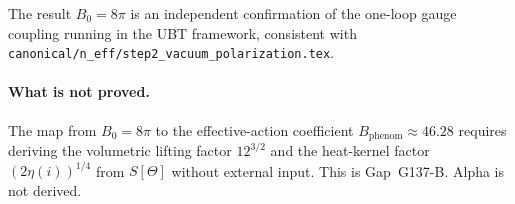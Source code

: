 \documentclass[12pt,a4paper]{article}
\theoremstyle{definition}
\theoremstyle{remark}
\begin{document}
The result $B_0 = 8\pi$ is an independent confirmation of the one-loop gauge
coupling running in the UBT framework, consistent with
\texttt{canonical/n\_eff/step2\_vacuum\_polarization.tex}.

\paragraph{What is not proved.}
The map from $B_0=8\pi$ to the effective-action coefficient
$B_{\mathrm{phenom}}\approx 46.28$ requires deriving the volumetric lifting
factor $12^{3/2}$ and the heat-kernel factor $(2\eta(i))^{1/4}$ from
$S[\Theta]$ without external input.
This is Gap~G137-B.
Alpha is not derived.



\end{document}
